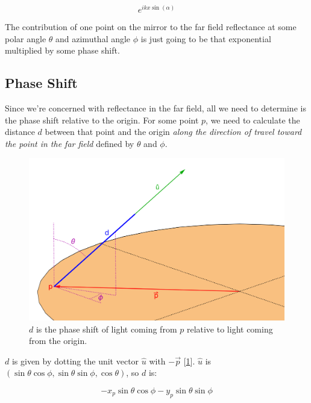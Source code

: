 \documentclass[etd,oneside,senior]{BYUPhys}
\begin{document}
\begin{equation}
  e^{ikx\sin\left({\alpha}\right)}
\end{equation}

The contribution of one point on the mirror to the far field reflectance at some polar angle $\theta$ and azimuthal angle $\phi$ is just going to be that exponential multiplied by some phase shift.

\subsection{Phase Shift} \label{sec:phase_shift}
Since we're concerned with reflectance in the far field, all we need to determine is the phase shift relative to the origin. For some point $p$, we need to calculate the distance $d$ between that point and the origin \textit{along the direction of travel toward the point in the far field} defined by $\theta$ and $\phi$.

\begin{figure}
  \centerline{\includegraphics[width=\textwidth]{phase-length}}
  \caption[Phase length of a beam of light]{\label{fig:phase_length}
    $d$ is the phase shift of light coming from $p$ relative to light coming from the origin.}
\end{figure}

$d$ is given by dotting the unit vector $\hat{u}$ with $-\vec{p}$ [\ref{fig:phase_length}]. $\hat{u}$ is $\left(\sin{\theta}\cos{\phi},\sin{\theta}\sin{\phi},\cos{\theta}\right)$, so $d$ is:

\begin{equation}
  -x_p\sin{\theta}\cos{\phi}-y_p\sin{\theta}\sin{\phi}
\end{equation}
\end{document}
